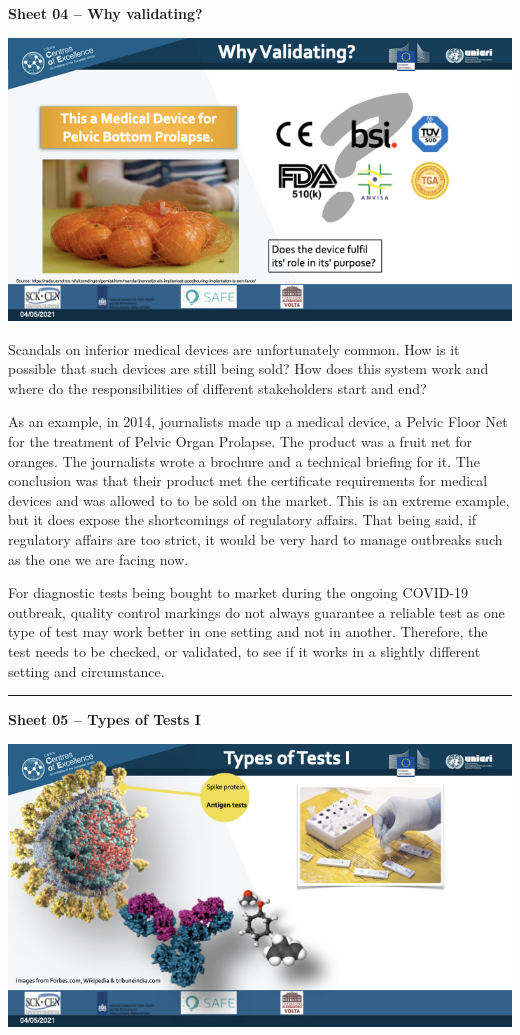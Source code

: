 \documentclass[
]{book}
\begin{document}
\textbf{Sheet 04 -- Why validating?}

\includegraphics{images/m02/m02_types_of_rapid_tests_final.004.jpeg}

Scandals on inferior medical devices are unfortunately common. How is it
possible that such devices are still being sold? How does this system
work and where do the responsibilities of different stakeholders start
and end?

As an example, in 2014, journalists made up a medical device, a Pelvic
Floor Net for the treatment of Pelvic Organ Prolapse. The product was a
fruit net for oranges. The journalists wrote a brochure and a technical
briefing for it. The conclusion was that their product met the
certificate requirements for medical devices and was allowed to to be
sold on the market. This is an extreme example, but it does expose the
shortcomings of regulatory affairs. That being said, if regulatory
affairs are too strict, it would be very hard to manage outbreaks such
as the one we are facing now.

For diagnostic tests being bought to market during the ongoing COVID-19
outbreak, quality control markings do not always guarantee a reliable
test as one type of test may work better in one setting and not in
another. Therefore, the test needs to be checked, or validated, to see
if it works in a slightly different setting and circumstance.

\begin{center}\rule{0.5\linewidth}{0.5pt}\end{center}

\textbf{Sheet 05 -- Types of Tests I}

\includegraphics{images/m02/m02_types_of_rapid_tests_final.005.jpeg}
\end{document}
